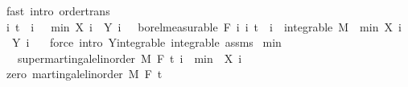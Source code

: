 \begin{isabellebody}
\ {\isacharparenleft}{\kern0pt}fast\ intro{\isacharcolon}{\kern0pt}\ order{\isachardot}{\kern0pt}trans{\isacharparenright}{\kern0pt}\isanewline
\ \ \isacommand{{\isacharbraceright}{\kern0pt}}\isamarkupfalse%
\isanewline
\ \ \isamarkupfalse%
\ {\isachardoublequoteopen}{\isasymAnd}i{\isachardot}{\kern0pt}\ t\ {\isasymle}\ i\ {\isasymLongrightarrow}\ {\isacharparenleft}{\kern0pt}{\isasymlambda}{\isasymxi}{\isachardot}{\kern0pt}\ min\ {\isacharparenleft}{\kern0pt}X\ i\ {\isasymxi}{\isacharparenright}{\kern0pt}\ {\isacharparenleft}{\kern0pt}Y\ i\ {\isasymxi}{\isacharparenright}{\kern0pt}{\isacharparenright}{\kern0pt}\ {\isasymin}\ borel{\isacharunderscore}{\kern0pt}measurable\ {\isacharparenleft}{\kern0pt}F\ i{\isacharparenright}{\kern0pt}{\isachardoublequoteclose}\ {\isachardoublequoteopen}{\isasymAnd}i{\isachardot}{\kern0pt}\ t\ {\isasymle}\ i\ {\isasymLongrightarrow}\ integrable\ M\ {\isacharparenleft}{\kern0pt}{\isasymlambda}{\isasymxi}{\isachardot}{\kern0pt}\ min\ {\isacharparenleft}{\kern0pt}X\ i\ {\isasymxi}{\isacharparenright}{\kern0pt}\ {\isacharparenleft}{\kern0pt}Y\ i\ {\isasymxi}{\isacharparenright}{\kern0pt}{\isacharparenright}{\kern0pt}{\isachardoublequoteclose}\ \isamarkupfalse%
\ {\isacharparenleft}{\kern0pt}force\ intro{\isacharcolon}{\kern0pt}\ Y{\isachardot}{\kern0pt}integrable\ integrable\ assms{\isacharparenright}{\kern0pt}{\isacharplus}{\kern0pt}\isanewline
{}\isamarkupfalse%
%
\endisatagproof
{\isafoldproof}%
%
\isadelimproof
\isanewline
%
\endisadelimproof
\isanewline
{}\isamarkupfalse%
\ min{\isacharunderscore}{\kern0pt}{}{\isacharcolon}{\kern0pt}\isanewline
\ \ \ {\isachardoublequoteopen}supermartingale{\isacharunderscore}{\kern0pt}linorder\ M\ F\ t\ {\isacharparenleft}{\kern0pt}{\isasymlambda}i\ {\isasymxi}{\isachardot}{\kern0pt}\ min\ {}\ {\isacharparenleft}{\kern0pt}X\ i\ {\isasymxi}{\isacharparenright}{\kern0pt}{\isacharparenright}{\kern0pt}{\isachardoublequoteclose}\isanewline
%
\isadelimproof
%
\endisadelimproof
%
\isatagproof
{}\isamarkupfalse%
\ {\isacharminus}{\kern0pt}\isanewline
\ \ \isamarkupfalse%
\ zero{\isacharcolon}{\kern0pt}\ martingale{\isacharunderscore}{\kern0pt}linorder\ M\ F\ t\ {\isachardoublequoteopen}{\isasymlambda}{\isacharunderscore}{\kern0pt}\ {\isacharunderscore}{\kern0pt}{\isachardot}{\kern0pt}\ {}{\isachardoublequoteclose}\ \isamarkupfalse%

\end{isabellebody}
